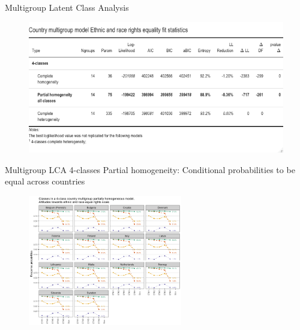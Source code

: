 \documentclass[11pt,t]{beamer}
\begin{document}
\begin{frame}{Multigroup Latent Class Analysis}
	
\vspace{-3.1mm} 
\begin{figure}
	\centering
	\includegraphics[height=0.5\textwidth]{graphics/MGmodelfitethn.png}
\end{figure}
\end{frame} 

\begin{frame}{Multigroup LCA 4-classes}
\vspace{-3.1mm} 
Partial homogeneity: Conditional probabilities to be equal across countries
\vspace{-3.1mm} 
\begin{figure}
	\centering
	\includegraphics[width=0.6\textwidth]{graphics/MGPHOMethnic.png}
\end{figure}
\end{frame} 

\end{document}
